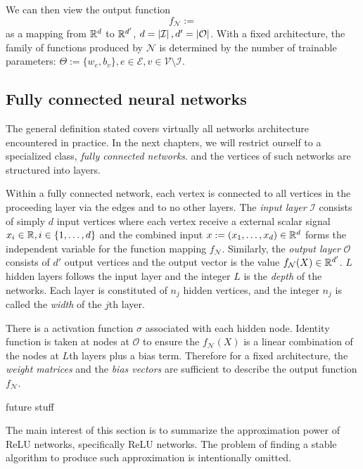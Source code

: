 We can then view the output function 
\begin{equation*}
    f_{\mathcal{N}} := 
\end{equation*}
as a mapping from $\mathbb{R}^d$ to $\mathbb{R}^{d'}$, $d = \left| \mathcal{I} \right|, d' =
\left| \mathcal{O} \right|$. With a fixed architecture, the family of functions produced
by $\mathcal{N}$ is determined by the number of trainable parameters: $\Theta :=
\{w_e,b_v\}, e \in \mathcal{E}, v \in \mathcal{V} \setminus \mathcal{I}$.

\subsection{Fully connected neural networks}

The general definition stated covers virtually all networks architecture
encountered in practice. In the next chapters, we will restrict ourself to a
specialized class, \textit{fully connected networks}. and the vertices of such
networks are structured into layers.


Within a fully connected network, each vertex is connected to all vertices in
the proceeding layer via the edges and to no other layers. The \textit{input
layer} $\mathcal{I}$ consists of simply $d$ input vertices where each vertex
receive a external scalar signal $x_i \in \mathbb{R}, i \in \{1, \dots, d\}$ and the
combined input $x := (x_1, \dots, x_d) \in \mathbb{R}^d$ forms the independent variable
for the function mapping $f_{\mathcal{N}}$. Similarly, the \textit{output layer}
$\mathcal{O}$ consists of $d'$ output vertices and the output vector is the
value $f_{\mathcal{N}}(X) \in \mathbb{R}^{d'}$. $L$ hidden layers follows the input
layer and the integer $L$ is the \textit{depth} of the networks. Each layer is
constituted of $n_j$ hidden vertices, and the integer $n_j$ is called the
\textit{width} of the $j$th layer. 

There is a activation function $\sigma$ associated with each hidden node.
Identity function is taken at nodes at $\mathcal{O}$ to ensure the
$f_{\mathcal{N}}(   X)$ is a linear combination of the nodes at $L$th layers plus a bias
term. Therefore for a fixed architecture, the \textit{weight matrices} and the
\textit{bias vectors} are sufficient to describe the output function
$f_{\mathcal{N}}$.



future stuff

The main interest of this section is to summarize the approximation power of
ReLU networks, specifically ReLU networks. The problem of finding a stable
algorithm to produce such approximation is intentionally omitted.


